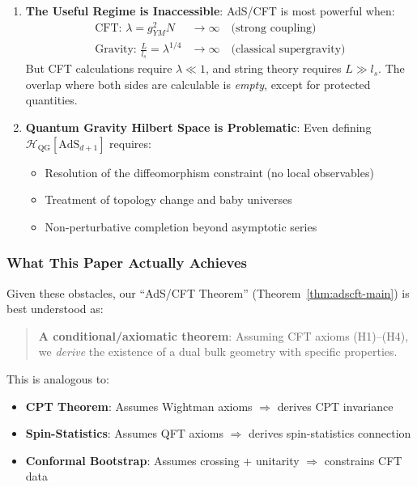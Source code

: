 \documentclass[12pt,a4paper]{article}
\begin{document}
\begin{enumerate}
    \item \textbf{The Useful Regime is Inaccessible}: AdS/CFT is most powerful when:
    \begin{align}
    \text{CFT: } \lambda = g_{YM}^2 N &\to \infty \quad \text{(strong coupling)} \\
    \text{Gravity: } \frac{L}{l_s} = \lambda^{1/4} &\to \infty \quad \text{(classical supergravity)}
    \end{align}
    But CFT calculations require $\lambda \ll 1$, and string theory requires $L \gg l_s$. The overlap where both sides are calculable is \emph{empty}, except for protected quantities.
    
    \item \textbf{Quantum Gravity Hilbert Space is Problematic}: Even defining $\mathcal{H}_{\text{QG}}[\text{AdS}_{d+1}]$ requires:
    \begin{itemize}
        \item Resolution of the diffeomorphism constraint (no local observables)
        \item Treatment of topology change and baby universes
        \item Non-perturbative completion beyond asymptotic series
    \end{itemize}
\end{enumerate}

\subsubsection{What This Paper Actually Achieves}

Given these obstacles, our ``AdS/CFT Theorem'' (Theorem~\ref{thm:adscft-main}) is best understood as:

\begin{quote}
\textbf{A conditional/axiomatic theorem}: Assuming CFT axioms (H1)--(H4), we \emph{derive} the existence of a dual bulk geometry with specific properties.
\end{quote}

This is analogous to:
\begin{itemize}
    \item \textbf{CPT Theorem}: Assumes Wightman axioms $\Rightarrow$ derives CPT invariance
    \item \textbf{Spin-Statistics}: Assumes QFT axioms $\Rightarrow$ derives spin-statistics connection
    \item \textbf{Conformal Bootstrap}: Assumes crossing + unitarity $\Rightarrow$ constrains CFT data
\end{itemize}
\end{document}
